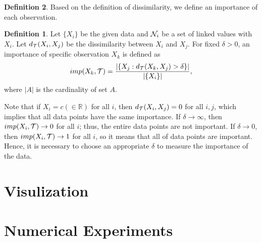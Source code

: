 \documentclass[preprint, review, 12pt]{article}
\theoremstyle{definition}
\newtheorem{dfn}{Definition}
\theoremstyle{remark}
\begin{document}
\begin{dfn}
Based on the definition of dissimilarity, we define an importance of each observation.

\begin{dfn}
	Let $\{X_i\}$ be the given data and ${\cal N}_{i}$ be a set of linked values with $X_i$. Let $d_{\cal T}(X_i,X_j)$ be the dissimilarity between $X_i$ and $X_j$. For fixed $\delta>0$, an importance of specific observation $X_{k}$ is defined as 
	\[
	imp(X_{k},{\cal T})=\frac{\left|\{X_{j}:d_{\cal T}(X_{k},X_{j})>\delta\}\right|}{\left|\{X_i\}\right|}, 
	\]
	where $|A|$ is the cardinality of set $A$. 
\end{dfn}

Note that if $X_i=c(\in \mathbb{R})$ for all $i$, then $d_{\cal T}(X_i,X_j)=0$ for all $i,j$, which implies that all data points have the same importance. If $\delta \to \infty$, then $imp(X_i,{\cal T}) \to 0$ for all $i$; thus, the entire data points are not important. If $\delta \to 0$, then $imp(X_i,{\cal T}) \to 1$ for all $i$, so it means that all of data points are important. Hence, it is necessary to choose an  appropriate $\delta$ to measure the importance of the data. 
\fi 
\section{Visulization}

\section{Numerical Experiments}

\end{dfn}
\end{document}
